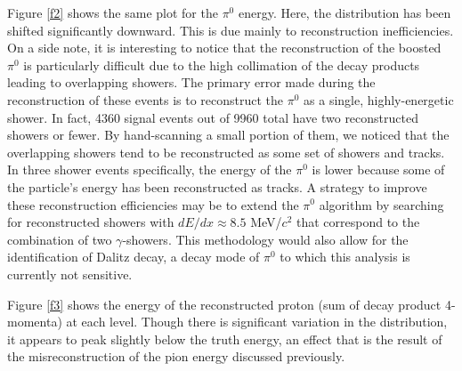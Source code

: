 \documentclass[a4paper, 10pt]{article}
\begin{document}
Figure  \ref{f2} shows the same plot for the $\pi^{0}$ energy. Here, the distribution has been shifted significantly downward. This is due mainly to reconstruction inefficiencies. On a side note, it is interesting to notice that the reconstruction of the boosted $\pi^{0}$ is particularly difficult due to the high collimation of the decay products leading to overlapping showers. The primary error made during the reconstruction of these events is to reconstruct the $\pi^{0}$ as a single, highly-energetic shower.  In fact, 4360 signal events out of 9960 total have two reconstructed showers or fewer. By hand-scanning a small portion of them, we noticed that the overlapping showers tend to be reconstructed as some set of showers and tracks. In three shower events specifically, the energy of the $\pi^{0}$ is lower because some of the particle's energy has been reconstructed as tracks. A strategy to improve these reconstruction efficiencies may be to extend the $\pi^{0}$ algorithm by searching for reconstructed showers with $dE/dx \approx 8.5$ MeV/$c^2$ that correspond to the combination of two $\gamma$-showers. This methodology would also allow for the identification of Dalitz decay, a decay mode of $\pi^{0}$ to which this analysis is currently not sensitive.


Figure \ref{f3} shows the energy of the reconstructed proton (sum of decay product 4-momenta) at each level. Though there is significant variation in the distribution, it appears to peak slightly below the truth energy, an effect that is the result of the misreconstruction of the pion energy discussed previously.
\end{document}
